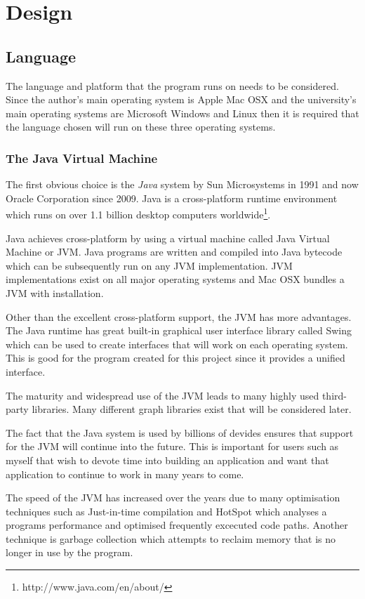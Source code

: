 \section{Design}

\subsection{Language}
  The language and platform that the program runs on needs to be considered. Since the author's main operating system is Apple Mac OSX and the university's main operating systems are Microsoft Windows and Linux then it is required that the language chosen will run on these three operating systems.

  \subsubsection{The Java Virtual Machine}
    The first obvious choice is the \emph{Java} system by Sun Microsystems in 1991 and now Oracle Corporation since 2009. Java is a cross-platform runtime environment which runs on over 1.1 billion desktop computers worldwide\footnote{http://www.java.com/en/about/}.

    Java achieves cross-platform by using a virtual machine called Java Virtual Machine or JVM. Java programs are written and compiled into Java bytecode which can be subsequently run on any JVM implementation. JVM implementations exist on all major operating systems and Mac OSX bundles a JVM with installation.

    Other than the excellent cross-platform support, the JVM has more advantages. The Java runtime has great built-in graphical user interface library called Swing which can be used to create interfaces that will work on each operating system. This is good for the program created for this project since it provides a unified interface.

    The maturity and widespread use of the JVM leads to many highly used third-party libraries. Many different graph libraries exist that will be considered later.

    The fact that the Java system is used by billions of devides ensures that support for the JVM will continue into the future. This is important for users such as myself that wish to devote time into building an application and want that application to continue to work in many years to come.

    The speed of the JVM has increased over the years due to many optimisation techniques such as Just-in-time compilation and HotSpot which analyses a programs performance and optimised frequently excecuted code paths. Another technique is garbage collection which attempts to reclaim memory that is no longer in use by the program.

